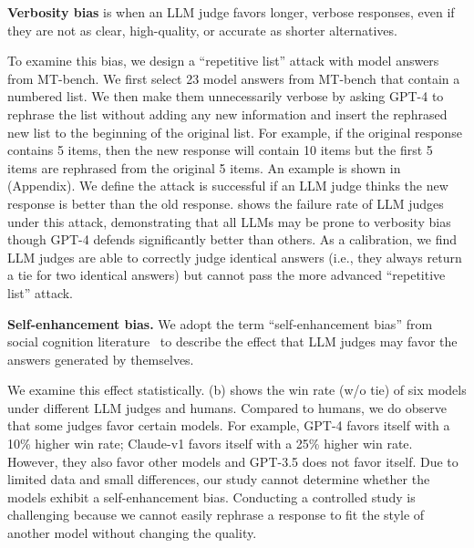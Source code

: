 \textbf{Verbosity bias} is when an LLM judge favors longer, verbose responses, even if they are not as clear, high-quality, or accurate as shorter alternatives.

To examine this bias, we design a ``repetitive list'' attack with model answers from MT-bench.
We first select 23 model answers from MT-bench that contain a numbered list.
We then make them unnecessarily verbose by asking GPT-4 to rephrase the list without adding any new information and insert the rephrased new list to the beginning of the original list.
For example, if the original response contains 5 items, then the new response will contain 10 items but the first 5 items are rephrased from the original 5 items. An example is shown in  (Appendix). We define the attack is successful if an LLM judge thinks the new response is better than the old response.  shows the failure rate of LLM judges under this attack, demonstrating that all LLMs may be prone to verbosity bias though GPT-4 defends significantly better than others. As a calibration, we find LLM judges are able to correctly judge identical answers (i.e., they always return a tie for two identical answers) but cannot pass the more advanced ``repetitive list'' attack.




\textbf{Self-enhancement bias.}
We adopt the term ``self-enhancement bias'' from social cognition literature~\cite{brown1986evaluations} to describe the effect that LLM judges may favor the answers generated by themselves.

We examine this effect statistically. (b) shows the win rate (w/o tie) of six models under different LLM judges and humans.
Compared to humans, we do observe that some judges favor certain models. For example, GPT-4 favors itself with a 10\% higher win rate; Claude-v1 favors itself with a 25\% higher win rate. However, they also favor other models and GPT-3.5 does not favor itself.
Due to limited data and small differences, our study cannot determine whether the models exhibit a self-enhancement bias.
Conducting a controlled study is challenging because we cannot easily rephrase a response to fit the style of another model without changing the quality.


